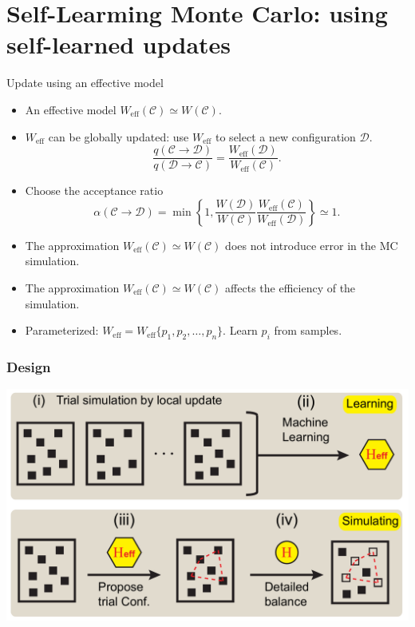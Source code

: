 \documentclass[xcolor=table, 10pt, aspectratio=169]{beamer}
\begin{document}
\section{Self-Learming Monte Carlo: using self-learned updates}

\begin{frame}{Update using an effective model}
\begin{itemize}
\item An effective model $W_{\text{eff}}(\mathcal C)\simeq W(\mathcal C)$.
\item $W_{\text{eff}}$ can be globally updated: use $W_{\text{eff}}$ to select a new configuration $\mathcal D$.
\[\frac{q(\mathcal C\rightarrow\mathcal D)}{q(\mathcal D\rightarrow\mathcal C)}
=\frac{W_{\text{eff}}(\mathcal D)}{W_{\text{eff}}(\mathcal C)}.\]
\item Choose the acceptance ratio
\[\alpha(\mathcal C\rightarrow\mathcal D) =
\min\left\{1, \frac{W(\mathcal D)}{W(\mathcal C)}
\frac{W_{\text{eff}}(\mathcal C)}{W_{\text{eff}}(\mathcal D)}
\right\}\simeq1.\]
\item The approximation $W_{\text{eff}}(\mathcal C)\simeq W(\mathcal C)$ does not introduce error in the MC simulation.
\item The approximation $W_{\text{eff}}(\mathcal C)\simeq W(\mathcal C)$ affects the efficiency of the simulation.
\item Parameterized: $W_{\text{eff}}=W_{\text{eff}}\{p_1,p_2,\ldots,p_n\}$. Learn $p_i$ from samples.
\end{itemize}
\end{frame}

\begin{frame}
  \frametitle{Design}
  \begin{center}
    \includegraphics[width=.8\textwidth]{Fig1}
  \end{center}
\end{frame}
\end{document}
